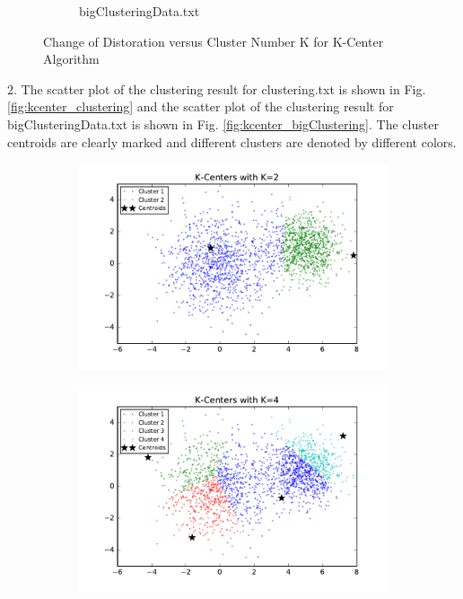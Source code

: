 \begin{description}
\begin{description}
\begin{figure}[H]
\begin{subfigure}[b]{0.49\textwidth}
            \caption{bigClusteringData.txt}\label{fig:4b}
        \end{subfigure}
\caption{Change of Distoration versus Cluster Number K for K-Center Algorithm}
\label{fig:k-centers-loss} 
\end{figure}

\item{2.} The scatter plot of the clustering result for clustering.txt is shown in Fig. \ref{fig:kcenter_clustering} and the scatter plot of the clustering result for bigClusteringData.txt is shown in Fig. \ref{fig:kcenter_bigClustering}. The cluster centroids are clearly marked and different clusters are denoted by different colors. 

\begin{figure}[!h]
        \centering
        \begin{subfigure}[b]{0.475\textwidth}
            \centering
            \includegraphics[width=\textwidth]{./figures/clustering_kCenter_2.pdf}
        \end{subfigure}
        \hfill
        \begin{subfigure}[b]{0.475\textwidth}  
            \centering 
            \includegraphics[width=\textwidth]{./figures/clustering_kCenter_4.pdf}

\end{subfigure}
\end{figure}
\end{description}
\end{description}
